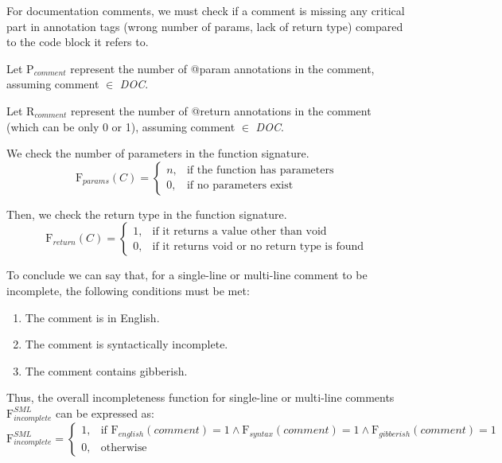 \noindent For documentation comments, we must check if a comment is missing any critical part in annotation tags (wrong number of params, lack of return type) compared to the code block it refers to.

\noindent Let $\mathrm{P}_{comment}$ represent the number of @param annotations in the comment, assuming comment $\in$ \textit{DOC}.

\noindent Let $\mathrm{R}_{comment}$ represent the number of @return annotations in the comment (which can be only 0 or 1), assuming comment $\in$ \textit{DOC}.

\noindent We check the number of parameters in the function signature.
\begin{equation*}
	\mathrm{F}_{params}(C) = \begin{cases}
		n, & \text{if the function has parameters} \\
		0, & \text{if no parameters exist}
	\end{cases}
\end{equation*}

\noindent Then, we check the return type in the function signature.
\begin{equation*}
	\mathrm{F}_{return}(C) = \begin{cases}
		1, & \text{if it returns a value other than void
		} \\
		0, & \text{if it returns void or no return type is found}
	\end{cases}
\end{equation*}

\noindent To conclude we can say that, for a single-line or multi-line comment to be incomplete, the following conditions must be met:
	\begin{enumerate}
		\item The comment is in English.
		\item The comment is syntactically incomplete.
		\item The comment contains gibberish.
	\end{enumerate}
	
\noindent Thus, the overall incompleteness function for single-line or multi-line comments $\mathrm{F}_{incomplete}^{SML}$ can be expressed as:
\begin{equation*}
	\mathrm{F}_{incomplete}^{SML} = \begin{cases}
		1, & \text{if } \mathrm{F}_{english}(comment) = 1 \wedge \mathrm{F}_{syntax}(comment) = 1 \wedge \mathrm{F}_{gibberish}(comment) = 1 \\
		0, & \text{otherwise}
	\end{cases}
\end{equation*}

